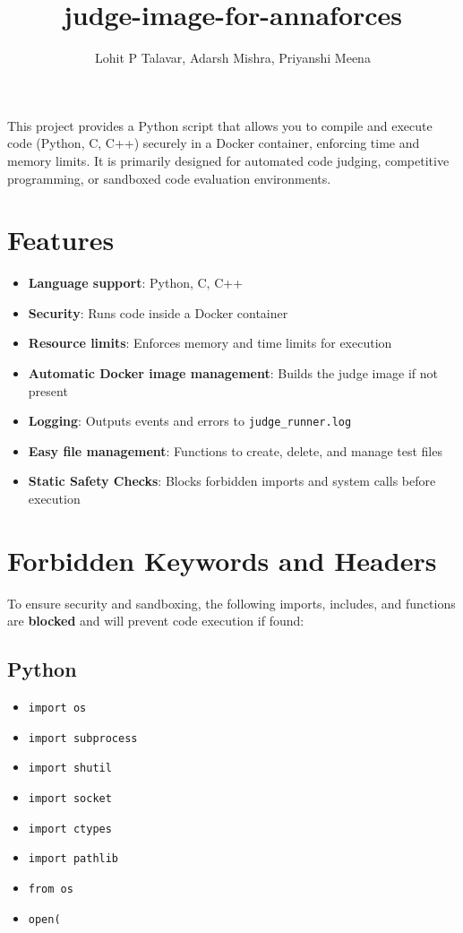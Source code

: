 \documentclass{article}
\begin{document}
\title{judge-image-for-annaforces}
\author{Lohit P Talavar, Adarsh Mishra, Priyanshi Meena}
\date{}
\maketitle

This project provides a Python script that allows you to compile and execute code (Python, C, C++) securely in a Docker container, enforcing time and memory limits. It is primarily designed for automated code judging, competitive programming, or sandboxed code evaluation environments.

\section*{Features}
\begin{itemize}
    \item \textbf{Language support}: Python, C, C++
    \item \textbf{Security}: Runs code inside a Docker container
    \item \textbf{Resource limits}: Enforces memory and time limits for execution
    \item \textbf{Automatic Docker image management}: Builds the judge image if not present
    \item \textbf{Logging}: Outputs events and errors to \texttt{judge\_runner.log}
    \item \textbf{Easy file management}: Functions to create, delete, and manage test files
    \item \textbf{Static Safety Checks}: Blocks forbidden imports and system calls before execution
\end{itemize}

\section*{Forbidden Keywords and Headers}

To ensure security and sandboxing, the following imports, includes, and functions are \textbf{blocked} and will prevent code execution if found:

\subsection*{Python}
\begin{itemize}
    \item \texttt{import os}
    \item \texttt{import subprocess}
    \item \texttt{import shutil}
    \item \texttt{import socket}
    \item \texttt{import ctypes}
    \item \texttt{import pathlib}
    \item \texttt{from os}
    \item \texttt{open(}
\end{itemize}
\end{document}
